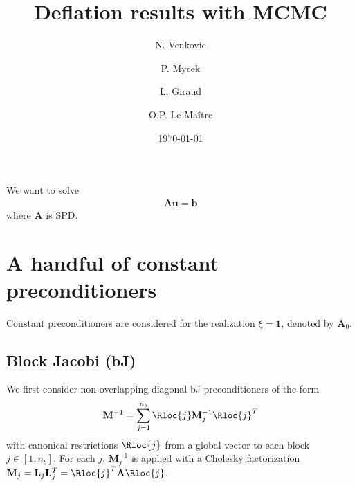 \documentclass{article}
\title{Deflation results with MCMC}
\author{N. Venkovic \and P. Mycek \and L. Giraud \and O.P. Le Ma\^{i}tre}
\date{\today}
\begin{document}
\maketitle

We want to solve
\begin{align}\label{eq:000}
\mathbf{A}\mathbf{u}=\mathbf{b}
\end{align}
where $\mathbf{A}$ is SPD.

\section{A handful of constant preconditioners}
Constant preconditioners are considered for the realization $\xi=\mathbf{1}$, denoted by $\mathbf{A}_0$.
\subsection{Block Jacobi (bJ)}
We first consider non-overlapping diagonal bJ preconditioners of the form
\begin{align}\label{eq:005}
\mathbf{M}^{-1}=\sum_{j=1}^{n_b}\Rloc{j}\mathbf{M}_j^{-1}\Rloc{j}^T
\end{align}
with canonical restrictions $\Rloc{j}$ from a global vector to each block $j\in[1,n_b]$.
For each $j$, $\mathbf{M}_j^{-1}$ is applied with a Cholesky factorization $\mathbf{M}_j=\mathbf{L}_j\mathbf{L}_j^T=\Rloc{j}^T\mathbf{A}\Rloc{j}$.
\end{document}
